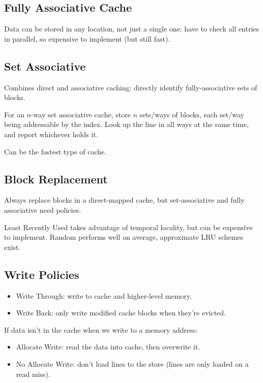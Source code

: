 \documentclass[11pt]{article}
\begin{document}
{    \subsection*{Fully Associative Cache}
    {
        Data can be stored in any location, not just a single one: have to check all entries in parallel, so expensive to implement (but still fast).
    }
    \subsection*{Set Associative}
    {
        Combines direct and associative caching: directly identify fully-associative sets of blocks.

        For an \(n\)-way set associative cache, store \(n\) sets/ways of blocks, each set/way being addressable by the index. Look up the line in all ways at the same time, and report whichever holds it.

        Can be the fastest type of cache.
    }
    \subsection*{Block Replacement}
    {
        Always replace blocks in a direct-mapped cache, but set-associative and fully associative need policies.

        Least Recently Used takes advantage of temporal locality, but can be expensive to implement. Random performs well on average, approximate LRU schemes exist.
    }
    \subsection*{Write Policies}
    {
        \begin{itemize}
        \item Write Through: write to cache and higher-level memory.
        \item Write Back: only write modified cache blocks when they're evicted.
        \end{itemize}

        If data isn't in the cache when we write to a memory address:
        \begin{itemize}
        \item Allocate Write: read the data into cache, then overwrite it.
        \item No Allocate Write: don't load lines to the store (lines are only loaded on a read miss).
        \end{itemize}

}}
\end{document}
